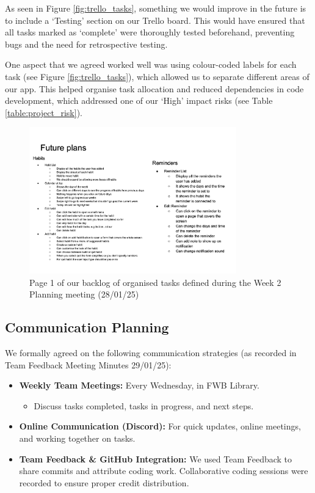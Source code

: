 As seen in Figure \ref{fig:trello_tasks}, something we would improve in the future is to include a ‘Testing’ section on our Trello board. This would have ensured that all tasks marked as ‘complete’ were thoroughly tested beforehand, preventing bugs and the need for retrospective testing.

One aspect that we agreed worked well was using colour-coded labels for each task (see Figure \ref{fig:trello_tasks}), which allowed us to separate different areas of our app. This helped organise task allocation and reduced dependencies in code development, which addressed one of our ‘High’ impact risks (see Table \ref{table:project_risk}).

\begin{figure}[H]
    \centering
    \includegraphics[width=0.8\textwidth]{resources/task_list.pdf}
    \caption{Page 1 of our backlog of organised tasks defined during the Week 2 Planning meeting (28/01/25)}
    \label{fig:task_list}
\end{figure}

\subsection{Communication Planning}
We formally agreed on the following communication strategies (as recorded in Team Feedback Meeting Minutes 29/01/25):

\begin{itemize}
    \item \textbf{Weekly Team Meetings:} Every Wednesday, in FWB Library.
    \begin{itemize}
        \item Discuss tasks completed, tasks in progress, and next steps.
    \end{itemize}
    \item \textbf{Online Communication (Discord):} For quick updates, online meetings, and working together on tasks.
    \item \textbf{Team Feedback \& GitHub Integration:} We used Team Feedback to share commits and attribute coding work. Collaborative coding sessions were recorded to ensure proper credit distribution.
\end{itemize}

